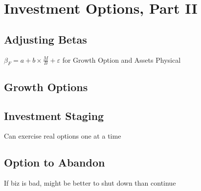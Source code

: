 \section{Investment Options, Part II}
	\subsection*{Adjusting Betas}
	$\beta_{F} = a + b\times\frac{M}{B} + \varepsilon$ for Growth Option and Assets Physical
	
	\subsection*{Growth Options}
	
	\subsection*{Investment Staging}
	Can exercise real options one at a time
	
	\subsection*{Option to Abandon}
	If biz is bad, might be better to shut down than continue
	